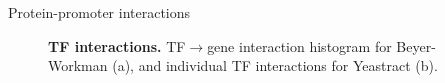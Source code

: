 \begin{frame}{Protein-promoter interactions}
\begin{figure}[ht]
\begin{subfigure}[t]{0.5\textwidth}
  \label{fig:yeastract}
  \end{subfigure}
  \caption{\textbf{TF interactions.} TF$\rightarrow$gene interaction histogram for Beyer-Workman (a), and individual TF interactions for Yeastract (b). }
\end{figure}
\end{frame}

